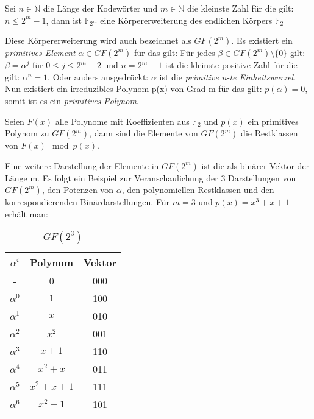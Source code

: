 \begin{t_def}
\label{def:m}
Sei $n \in \mathbb{N}$ die Länge der Kodewörter und $m \in \mathbb{N}$ die kleinste Zahl für die gilt: $n \leq 2^m -1$, dann ist $\mathbb{F}_{2^m}$ eine Körpererweiterung des endlichen Körpers $\mathbb{F}_{2}$
\end{t_def}

Diese Körpererweiterung wird auch bezeichnet als $GF(2^m)$. 
Es existiert ein \textit{primitives Element} $\alpha \in GF(2^m)$ für das gilt: Für jedes $\beta \in GF(2^m)\setminus\{0\}$ gilt: $\beta = \alpha^j$ für $0 \leq j \leq 2^m -2$ und $n = 2^m-1$ ist die kleinste positive Zahl für die gilt: $\alpha^n = 1$. Oder anders ausgedrückt: $\alpha$ ist die {\em primitive n-te Einheitswurzel}.\cite[S. 48ff]{morelos2006art}
Nun existiert ein irreduzibles Polynom p(x) von Grad m für das gilt: $p(\alpha) = 0$, somit ist es ein {\em primitives Polynom}.

\begin{t_def}
Seien $F(x)$ alle Polynome mit Koeffizienten aus $\mathbb{F}_2$ und $p(x)$ ein primitives Polynom zu $GF(2^m)$, dann sind die Elemente von $GF(2^m)$ die Restklassen von $F(x) \mod p(x)$.  \cite[S. 161]{bose2008infotheory}
\end{t_def}

Eine weitere Darstellung der Elemente in $GF(2^m)$ ist die als binärer Vektor der Länge m. Es folgt ein Beispiel zur Veranschaulichung der 3 Darstellungen von $GF(2^m)$, den Potenzen von $\alpha$, den polynomiellen Restklassen und den korrespondierenden Binärdarstellungen. Für $m=3$ und $p(x) = x^3 + x + 1$ erhält man:


\begin{table}[!h]
\begin{center}
\begin{tabular}{c|c|c}
$\alpha^i$ & Polynom & Vektor \\
\hline
- & 0 & 000 \\
$\alpha^0$ & $1$ & 100 \\
$\alpha^1$ & $x$ & 010 \\
$\alpha^2$ & $x^2$ & 001 \\
$\alpha^3$ & $x+1$ & 110 \\
$\alpha^4$ & $x^2+x$ & 011 \\
$\alpha^5$ & $x^2+x+1$ & 111 \\
$\alpha^6$ & $x^2+1$ & 101 \\
\end{tabular}
\caption{$GF(2^3)$}
\label{table:gf}
\end{center}
\end{table}




